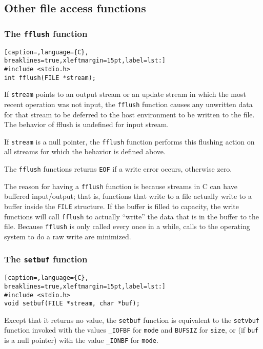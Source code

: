 \subsection{Other file access functions}
\subsubsection{The \texttt{fflush} function}
\lstset{basicstyle=\scriptsize, numbers=left, captionpos=b, tabsize=4}
\begin{lstlisting}[caption=,language={C},
breaklines=true,xleftmargin=15pt,label=lst:]
#include <stdio.h>
int fflush(FILE *stream);
\end{lstlisting}

If \texttt{stream} points to an output stream or an update stream in which the
most recent operation was not input, the \texttt{fflush} function causes any
unwritten data for that stream to be deferred to the host environment to be
written to the file. The behavior of fflush is undefined for input stream.

If \texttt{stream} is a null pointer, the \texttt{fflush} function performs
this flushing action on all streams for which the behavior is defined above.

The \texttt{fflush} functions returns \texttt{EOF} if a write error occurs,
otherwise zero.

The reason for having a \texttt{fflush} function is because streams in C can
have buffered input/output; that is, functions that write to a file actually
write to a buffer inside the \texttt{FILE} structure. If the buffer is filled
to capacity, the write functions will call \texttt{fflush} to actually
``write'' the data that is in the buffer to the file. Because \texttt{fflush}
is only called every once in a while, calls to the operating system to do a raw
write are minimized.

\subsubsection{The \texttt{setbuf} function}
\lstset{basicstyle=\scriptsize, numbers=left, captionpos=b, tabsize=4}
\begin{lstlisting}[caption=,language={C},
breaklines=true,xleftmargin=15pt,label=lst:]
#include <stdio.h>
void setbuf(FILE *stream, char *buf);
\end{lstlisting}

Except that it returns no value, the \texttt{setbuf} function is equivalent to
the \texttt{setvbuf} function invoked with the values \texttt{\_IOFBF} for
\texttt{mode} and \texttt{BUFSIZ} for \texttt{size}, or (if \texttt{buf} is a
null pointer) with the value \texttt{\_IONBF} for \texttt{mode}.

